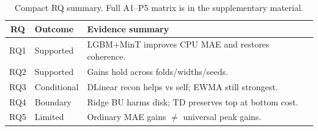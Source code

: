 \begin{table}[width=\columnwidth,pos=!ht]
\centering
\caption{Compact RQ summary. Full A1--P5 matrix is in the supplementary material.}
\label{tab:claim_summary}
\begin{threeparttable}
\small
\begin{tabularx}{\tblwidth}{@{}cl>{\raggedright\arraybackslash}X@{}}
\toprule
RQ & Outcome & Evidence summary \\
\midrule
RQ1 & Supported & LGBM+MinT improves CPU MAE and restores coherence. \\
RQ2 & Supported & Gains hold across folds/widths/seeds. \\
RQ3 & Conditional & DLinear recon helps vs self; EWMA still strongest. \\
RQ4 & Boundary & Ridge BU harms disk; TD preserves top at bottom cost. \\
RQ5 & Limited & Ordinary MAE gains $\neq$ universal peak gains. \\
\bottomrule
\end{tabularx}
\end{threeparttable}
\end{table}
